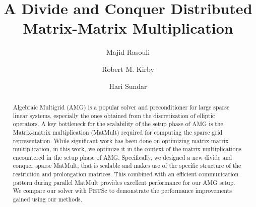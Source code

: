 \documentclass[sigconf]{acmart}
\begin{document}
%
\title[Divide and Conquer Distributed Matrix-Matrix Multiplication]{A Divide and Conquer Distributed Matrix-Matrix Multiplication}

%
\author{Majid Rasouli}

\author{Robert M. Kirby}

\author{Hari Sundar}


\begin{abstract}
Algebraic Multigrid (AMG) is a popular solver and preconditioner for large sparse linear systems, especially the ones obtained from the discretization of elliptic operators.
A key bottleneck for the scalability of the setup phase of AMG is the Matrix-matrix multiplication (MatMult) required for computing the sparse grid representation. While significant work has been done on optimizing matrix-matrix multiplication, in this work, we optimize it in the context of the matrix multiplications encountered in the setup phase of AMG. Specifically, we designed a new divide and conquer sparse MatMult, that is scalable and makes use of the specific structure of the restriction and prolongation matrices. This combined with an efficient communication pattern during parallel MatMult provides excellent performance for our AMG setup. We compare our solver with PETSc to demonstrate the performance improvements gained using our methods.
\end{abstract}
\end{document}
